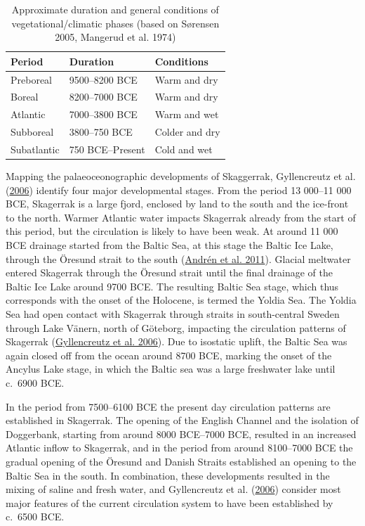 \documentclass[
  a4paper,
  oneside]{uiophdthesis}
\begin{document}
\begin{table}

\caption{\label{tab:climate}Approximate duration and general conditions of vegetational/climatic phases (based on Sørensen 2005, Mangerud et al. 1974)}
\centering
\begin{tabular}[t]{lll}
\toprule
Period & Duration & Conditions\\
\midrule
Preboreal & 9500--8200 BCE & Warm and dry\\
Boreal & 8200--7000 BCE & Warm and dry\\
Atlantic & 7000--3800 BCE & Warm and wet\\
Subboreal & 3800--750 BCE & Colder and dry\\
Subatlantic & 750 BCE--Present & Cold and wet\\
\bottomrule
\end{tabular}
\end{table}

Mapping the palaeoceonographic developments of Skaggerrak, Gyllencreutz et al. (\protect\hyperlink{ref-gyllencreutz2006}{2006}) identify four major developmental stages. From the period 13 000--11 000 BCE, Skagerrak is a large fjord, enclosed by land to the south and the ice-front to the north. Warmer Atlantic water impacts Skagerrak already from the start of this period, but the circulation is likely to have been weak. At around 11 000 BCE drainage started from the Baltic Sea, at this stage the Baltic Ice Lake, through the Öresund strait to the south (\protect\hyperlink{ref-andren2011}{Andrén et al. 2011}). Glacial meltwater entered Skagerrak through the Öresund strait until the final drainage of the Baltic Ice Lake around 9700 BCE. The resulting Baltic Sea stage, which thus corresponds with the onset of the Holocene, is termed the Yoldia Sea. The Yoldia Sea had open contact with Skagerrak through straits in south-central Sweden through Lake Vänern, north of Göteborg, impacting the circulation patterns of Skagerrak (\protect\hyperlink{ref-gyllencreutz2006}{Gyllencreutz et al. 2006}). Due to isostatic uplift, the Baltic Sea was again closed off from the ocean around 8700 BCE, marking the onset of the Ancylus Lake stage, in which the Baltic sea was a large freshwater lake until c.~6900 BCE.

In the period from 7500--6100 BCE the present day circulation patterns are established in Skagerrak. The opening of the English Channel and the isolation of Doggerbank, starting from around 8000 BCE--7000 BCE, resulted in an increased Atlantic inflow to Skagerrak, and in the period from around 8100--7000 BCE the gradual opening of the Öresund and Danish Straits established an opening to the Baltic Sea in the south. In combination, these developments resulted in the mixing of saline and fresh water, and Gyllencreutz et al. (\protect\hyperlink{ref-gyllencreutz2006}{2006}) consider most major features of the current circulation system to have been established by c.~6500 BCE.
\end{document}
